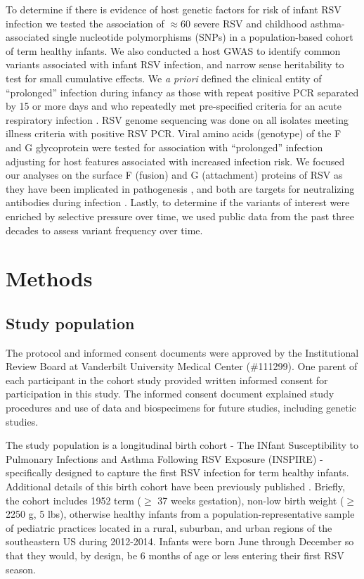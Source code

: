 \documentclass{article} %
\begin{document}
To determine if there is evidence of host genetic factors for risk of infant RSV infection we tested the association of $\approx 60$ severe RSV and childhood asthma-associated single nucleotide polymorphisms (SNPs) in a population-based cohort of term healthy infants.
We also conducted a host GWAS to identify common variants associated with infant RSV infection, and narrow sense heritability to test for small cumulative effects. 
We \textit{a priori} defined the clinical entity of ``prolonged'' infection during infancy as those with repeat positive PCR separated by 15 or more days and who repeatedly met pre-specified criteria for an acute respiratory infection
\citep{okiro2010duration}.
RSV genome sequencing was done on all isolates meeting illness criteria with positive RSV PCR. 
Viral amino acids (genotype) of the F and G glycoprotein were tested for association with ``prolonged'' infection adjusting for host features associated with increased infection risk. 
We focused our analyses on the surface F (fusion) and G (attachment) proteins of RSV as they have been implicated in pathogenesis \citep{boyoglu2015anti,bukreyev2012secreted}, 
and both are targets for neutralizing antibodies during infection
\citep{anderson1988neutralization, ngwuta2015prefusion}.
Lastly, to determine if the variants of interest were enriched by selective pressure over time, we used public data from the past three decades to assess variant frequency over time.

\section{Methods}
\subsection{Study population}
The protocol and informed consent documents were approved by the Institutional Review Board at Vanderbilt University Medical Center (\#111299).  
One parent of each participant in the cohort study provided written informed consent for participation in this study. 
The informed consent document explained study procedures and use of data and biospecimens for future studies, including genetic studies.

The study population is a longitudinal birth cohort - The INfant Susceptibility to Pulmonary Infections and Asthma Following RSV Exposure (INSPIRE) - specifically designed to capture the first RSV infection for term healthy infants. 
Additional details of this birth cohort have been previously published 
\citep{larkin_objectives_2015}.
Briefly, the cohort includes 1952 term ($\ge$ 37 weeks gestation), non-low birth weight ($\ge$ 2250 g, 5 lbs), otherwise healthy infants from a population-representative sample of pediatric practices located in a rural, suburban, and urban regions of the southeastern US during 2012-2014. 
Infants were born June through December so that they would, by design, be 6 months of age or less entering their first RSV season. 
\end{document}
